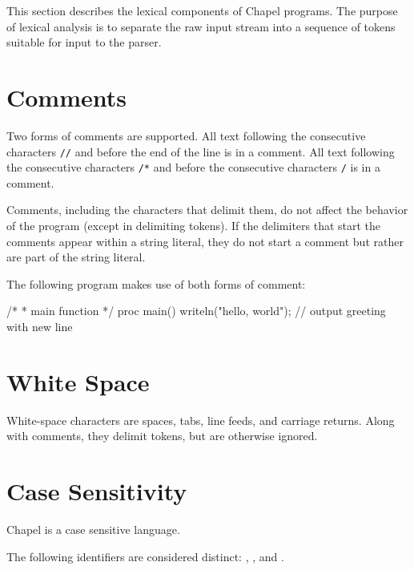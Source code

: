 \label{Lexical_Structure}

This section describes the lexical components of Chapel programs.
The purpose of lexical analysis is
to separate the raw input stream into a sequence of tokens suitable
for input to the parser.  

\section{Comments}
\label{Comments}

Two forms of comments are supported.  All text following the
consecutive characters {\tt //} and before the end of the line is in a
comment.  All text following the consecutive characters {\tt /*} and
before the consecutive characters {\tt */} is in a comment.

Comments, including the characters that delimit them, do not affect
the behavior of the program (except in delimiting tokens).  If the
delimiters that start the comments appear within a string literal,
they do not start a comment but rather are part of the string literal.

\begin{example}
The following program makes use of both forms of comment:
\begin{chapel}
/*
 *  main function
 */
proc main() {
  writeln("hello, world"); // output greeting with new line
}
\end{chapel}
\end{example}

\section{White Space}
\label{White_Space}

White-space characters are spaces, tabs, line feeds, and carriage
returns.  Along with comments, they delimit tokens, but are otherwise
ignored.

\section{Case Sensitivity}
\label{Case_Sensitivity}

Chapel is a case sensitive language.

\begin{example}
The following identifiers are considered
distinct: , , and .
\end{example}


